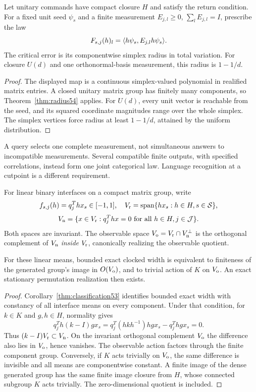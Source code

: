 \begin{corollary}\label{cor:quantum54}
Let unitary commands have compact closure $H$ and satisfy the return condition. For a fixed unit seed $\psi_s$ and a finite measurement $E_{j,l}\ge0$, $\sum_lE_{j,l}=I$, prescribe the law
\[
 F_{s,j}(h)_l=\langle h\psi_s,E_{j,l}h\psi_s\rangle.
\]
The critical error is its componentwise simplex radius in total variation. For closure $U(d)$ and one orthonormal-basis measurement, this radius is $1-1/d$.
\end{corollary}
\begin{proof}
The displayed map is a continuous simplex-valued polynomial in realified matrix entries. A closed unitary matrix group has finitely many components, so Theorem~\ref{thm:radius54} applies. For $U(d)$, every unit vector is reachable from the seed, and its squared coordinate magnitudes range over the whole simplex. The simplex vertices force radius at least $1-1/d$, attained by the uniform distribution.
\end{proof}
A query selects one complete measurement, not simultaneous answers to incompatible measurements. Several compatible finite outputs, with specified correlations, instead form one joint categorical law. Language recognition at a cutpoint is a different requirement.

For linear binary interfaces on a compact matrix group, write
\[
 f_{s,j}(h)=q_j^Thx_s\in[-1,1],\quad
 V_{\rm r}=\operatorname{span}\{hx_s:h\in H,s\in\mathcal S\},
\]
\[
 V_{\rm n}=\{x\in V_{\rm r}:q_j^Thx=0\text{ for all }h\in H,j\in\mathcal J\}.
\]
Both spaces are invariant. The observable space $V_{\rm o}=V_{\rm r}\cap V_{\rm n}^\perp$ is the orthogonal complement of $V_{\rm n}$ \emph{inside} $V_{\rm r}$, canonically realizing the observable quotient.

\begin{theorem}\label{thm:observable53}
For these linear means, bounded exact clocked width is equivalent to finiteness of the generated group's image in $O(V_{\rm o})$, and to trivial action of $K$ on $V_{\rm o}$. An exact stationary permutation realization then exists.
\end{theorem}
\begin{proof}
Corollary~\ref{thm:classification53} identifies bounded exact width with constancy of all interface means on every component. Under that condition, for $k\in K$ and $g,h\in H$, normality gives
\[
 q_j^Th(k-I)gx_s=q_j^T(hkh^{-1})hgx_s-q_j^Thgx_s=0.
\]
Thus $(k-I)V_{\rm r}\subset V_{\rm n}$. On the invariant orthogonal complement $V_{\rm o}$ the difference also lies in $V_{\rm o}$, hence vanishes. The observable action factors through the finite component group. Conversely, if $K$ acts trivially on $V_{\rm o}$, the same difference is invisible and all means are componentwise constant. A finite image of the dense generated group has the same finite image closure from $H$, whose connected subgroup $K$ acts trivially. The zero-dimensional quotient is included.
\end{proof}

